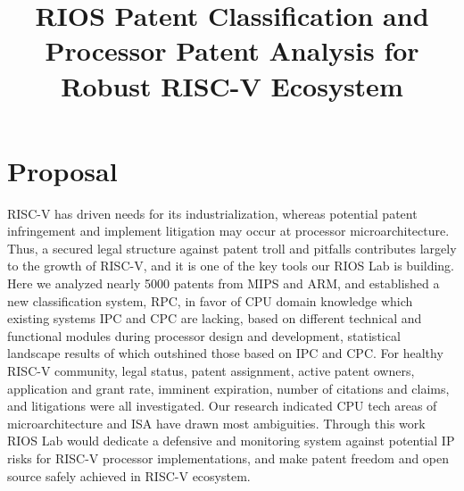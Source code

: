 \documentclass{article}
\title{RIOS Patent Classification and Processor Patent Analysis for Robust RISC-V Ecosystem}
\begin{document}
\maketitle

\section{Proposal}

RISC-V has driven needs for its industrialization, whereas potential patent infringement and implement litigation may occur at processor microarchitecture. Thus, a secured legal structure against patent troll and pitfalls contributes largely to the growth of RISC-V, and it is one of the key tools our RIOS Lab is building. Here we analyzed nearly 5000 patents from MIPS and ARM, and established a new classification system, RPC, in favor of CPU domain knowledge which existing systems IPC and CPC are lacking, based on different technical and functional modules during processor design and development, statistical landscape results of which outshined those based on IPC and CPC. For healthy RISC-V community, legal status, patent assignment, active patent owners, application and grant rate, imminent expiration, number of citations and claims, and litigations were all investigated. Our research indicated CPU tech areas of microarchitecture and ISA have drawn most ambiguities. Through this work RIOS Lab would dedicate a defensive and monitoring system against potential IP risks for RISC-V processor implementations, and make patent freedom and open source safely achieved in RISC-V ecosystem.
\end{document}
